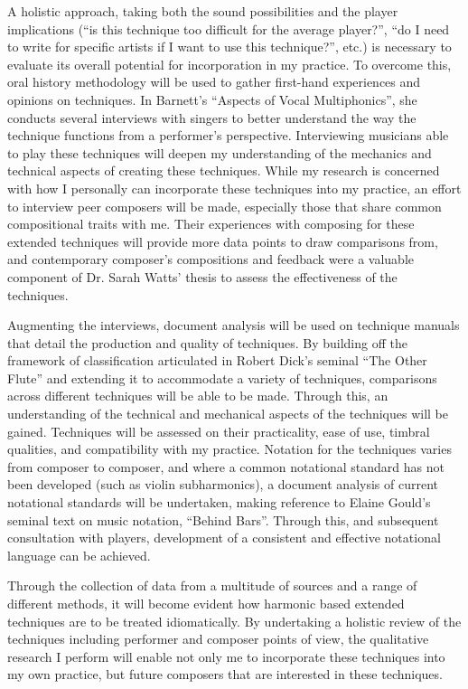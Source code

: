 A holistic approach, taking both the sound possibilities and the player implications (“is this technique too difficult for the average player?”, “do I need to write for specific artists if I want to use this technique?”, etc.) is necessary to evaluate its overall potential for incorporation in my practice. To overcome this, oral history methodology will be used to gather first-hand experiences and opinions on techniques. In Barnett’s “Aspects of Vocal Multiphonics”, she conducts several interviews with singers to better understand the way the technique functions from a performer’s perspective.\autocite{barnettAspectsVocalMultiphonics1977} Interviewing musicians able to play these techniques will deepen my understanding of the mechanics and technical aspects of creating these techniques. While my research is concerned with how I personally can incorporate these techniques into my practice, an effort to interview peer composers will be made, especially those that share common compositional traits with me. Their experiences with composing for these extended techniques will provide more data points to draw comparisons from, and contemporary composer’s compositions and feedback were a valuable component of Dr. Sarah Watts’ thesis to assess the effectiveness of the techniques.

Augmenting the interviews, document analysis will be used on technique manuals that detail the production and quality of techniques. By building off the framework of classification articulated in Robert Dick’s seminal “The Other Flute” and extending it to accommodate a variety of techniques, comparisons across different techniques will be able to be made.\autocite{dickOtherFlute1989}  Through this, an understanding of the technical and mechanical aspects of the techniques will be gained. Techniques will be assessed on their practicality, ease of use, timbral qualities, and compatibility with my practice. Notation for the techniques varies from composer to composer, and where a common notational standard has not been developed (such as violin subharmonics), a document analysis of current notational standards will be undertaken, making reference to Elaine Gould’s seminal text on music notation, “Behind Bars”.\autocite{gouldBars2011} Through this, and subsequent consultation with players, development of a consistent and effective notational language can be achieved.

Through the collection of data from a multitude of sources and a range of different methods, it will become evident how harmonic based extended techniques are to be treated idiomatically. By undertaking a holistic review of the techniques including performer and composer points of view, the qualitative research I perform will enable not only me to incorporate these techniques into my own practice, but future composers that are interested in these techniques.

